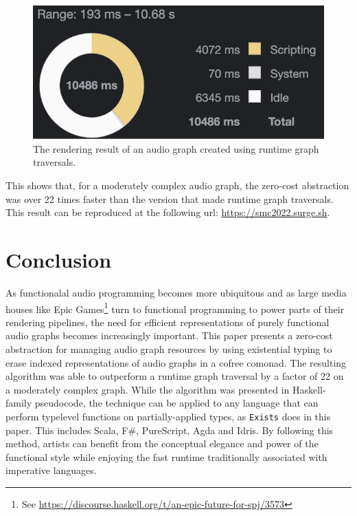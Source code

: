 \documentclass{article}
\begin{document}
\begin{figure}[t]
\centering
\includegraphics[width=0.6\columnwidth]{slow}
\caption{The rendering result of an audio graph created using runtime graph traversals.\label{fig:second_version_rendering}}
\end{figure}

This shows that, for a moderately complex audio graph, the zero-cost abstraction was over 22 times faster than the version that made runtime graph traversals. This result can be reproduced at the following url: \url{https://smc2022.surge.sh}.

\section{Conclusion}

As functionalal audio programming becomes more ubiquitous and as large media houses like Epic Games\footnote{See \url{https://discourse.haskell.org/t/an-epic-future-for-spj/3573}} turn to functional programming to power parts of their rendering pipelines, the need for efficient representations of purely functional audio graphs becomes increasingly important. This paper presents a zero-cost abstraction for managing audio graph resources by using existential typing to erase indexed representations of audio graphs in a cofree comonad. The resulting algorithm was able to outperform a runtime graph traversal by a factor of 22 on a moderately complex graph. While the algorithm was presented in Haskell-family pseudocode, the technique can be applied to any language that can perform typelevel functions on partially-applied types, as \texttt{Exists} does in this paper. This includes Scala, F\#, PureScript, Agda and Idris. By following this method, artists can benefit from the conceptual elegance and power of the functional style while enjoying the fast runtime traditionally associated with imperative languages.

\label{sec:conclusion}



\end{document}
